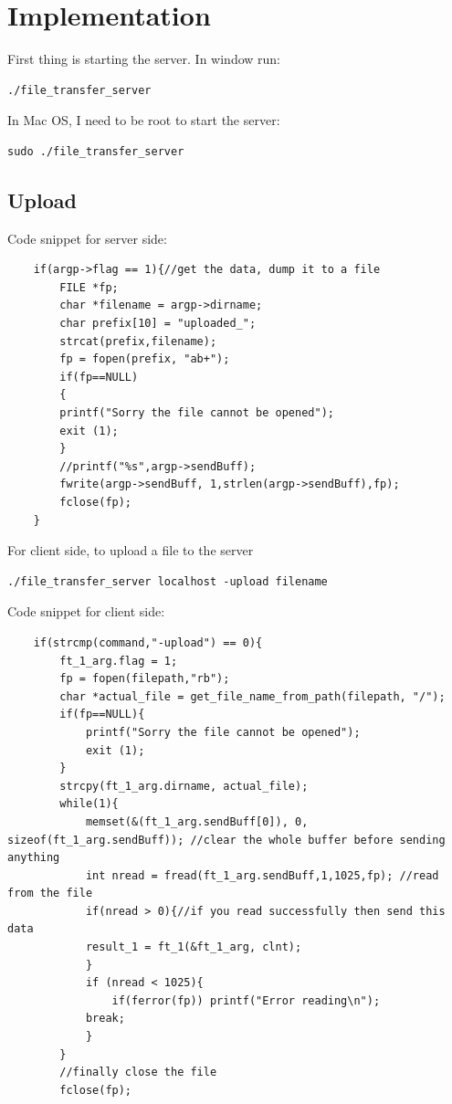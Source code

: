 \documentclass{article}
\begin{document}
\section{Implementation}
First thing is starting the server. In window run:
\begin{lstlisting}
./file_transfer_server
\end{lstlisting}
In Mac OS, I need to be root to start the server:
\begin{lstlisting}
sudo ./file_transfer_server
\end{lstlisting}

\subsection{Upload}
Code snippet for server side:
\begin{lstlisting}
    if(argp->flag == 1){//get the data, dump it to a file
		FILE *fp;
		char *filename = argp->dirname;
		char prefix[10] = "uploaded_";
		strcat(prefix,filename);
		fp = fopen(prefix, "ab+");
		if(fp==NULL)
		{
		printf("Sorry the file cannot be opened");
		exit (1);
		}
		//printf("%s",argp->sendBuff);
		fwrite(argp->sendBuff, 1,strlen(argp->sendBuff),fp);
		fclose(fp);
	}
\end{lstlisting}
For client side, to upload a file to the server
\begin{lstlisting}
./file_transfer_server localhost -upload filename
\end{lstlisting}
Code snippet for client side:
\begin{lstlisting}
    if(strcmp(command,"-upload") == 0){
		ft_1_arg.flag = 1;
		fp = fopen(filepath,"rb");
		char *actual_file = get_file_name_from_path(filepath, "/");
		if(fp==NULL){
			printf("Sorry the file cannot be opened");
			exit (1);
		}
		strcpy(ft_1_arg.dirname, actual_file);
		while(1){
			memset(&(ft_1_arg.sendBuff[0]), 0, sizeof(ft_1_arg.sendBuff)); //clear the whole buffer before sending anything
			int nread = fread(ft_1_arg.sendBuff,1,1025,fp); //read from the file
			if(nread > 0){//if you read successfully then send this data
			result_1 = ft_1(&ft_1_arg, clnt);
			}
			if (nread < 1025){
				if(ferror(fp)) printf("Error reading\n");
			break;
			}
		}
		//finally close the file
		fclose(fp);
\end{lstlisting}
\end{document}
